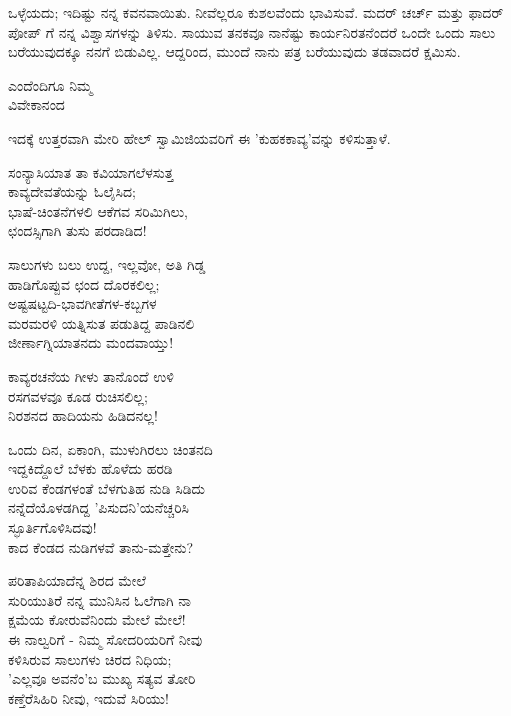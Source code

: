 ಒಳ್ಳೆಯದು; ಇದಿಷ್ಟು ನನ್ನ ಕವನವಾಯಿತು. ನೀವೆಲ್ಲರೂ ಕುಶಲವೆಂದು ಭಾವಿಸುವೆ. ಮದರ್ ಚರ್ಚ್ ಮತ್ತು ಫಾದರ್ ಪೋಪ್ ಗೆ ನನ್ನ ವಿಶ್ವಾಸಗಳನ್ನು ತಿಳಿಸು. ಸಾಯುವ ತನಕವೂ ನಾನೆಷ್ಟು ಕಾರ್ಯನಿರತನೆಂದರೆ ಒಂದೇ ಒಂದು ಸಾಲು ಬರೆಯುವುದಕ್ಕೂ ನನಗೆ ಬಿಡುವಿಲ್ಲ. ಆದ್ದರಿಂದ, ಮುಂದೆ ನಾನು ಪತ್ರ ಬರೆಯುವುದು ತಡವಾದರೆ ಕ್ಷಮಿಸು.

\begin{flushright}
ಎಂದೆಂದಿಗೂ ನಿಮ್ಮ\\ವಿವೇಕಾನಂದ
\end{flushright}

ಇದಕ್ಕೆ ಉತ್ತರವಾಗಿ ಮೇರಿ ಹೇಲ್ ಸ್ವಾಮಿಜಿಯವರಿಗೆ ಈ 'ಕುಹಕಕಾವ್ಯ'ವನ್ನು ಕಳಿಸುತ್ತಾಳೆ.

\begin{myquote}
ಸಂನ್ಯಾಸಿಯಾತ ತಾ ಕವಿಯಾಗಲೆಳಸುತ್ತ\\ಕಾವ್ಯದೇವತೆಯನ್ನು ಓಲೈಸಿದ;\\ಭಾಷೆ-ಚಿಂತನೆಗಳಲಿ ಆಕೆಗವ ಸರಿಮಿಗಿಲು,\\ಛಂದಸ್ಸಿಗಾಗಿ ತುಸು ಪರದಾಡಿದ!
\end{myquote}

\begin{myquote}
ಸಾಲುಗಳು ಬಲು ಉದ್ದ, ಇಲ್ಲವೋ, ಅತಿ ಗಿಡ್ಡ\\ಹಾಡಿಗೊಪ್ಪುವ ಛಂದ ದೊರಕಲಿಲ್ಲ;\\ಅಷ್ಟಷಟ್ಟದಿ-ಭಾವಗೀತೆಗಳ-ಕಬ್ಬಗಳ\\ಮರಮರಳಿ ಯತ್ನಿಸುತ ಪಡುತಿದ್ದ ಪಾಡಿನಲಿ\\ಜೀರ್ಣಾಗ್ನಿಯಾತನದು ಮಂದವಾಯ್ತು!
\end{myquote}

\begin{myquote}
ಕಾವ್ಯರಚನೆಯ ಗೀಳು ತಾನೊಂದೆ ಉಳಿ\\ರಸಗವಳವೂ ಕೂಡ ರುಚಿಸಲಿಲ್ಲ;\\ನಿರಶನದ ಹಾದಿಯನು ಹಿಡಿದನಲ್ಲ!
\end{myquote}

\begin{myquote}
ಒಂದು ದಿನ, ಏಕಾಂಗಿ, ಮುಳುಗಿರಲು ಚಿಂತನದಿ\\ಇದ್ದಕಿದ್ದೊಲೆ ಬೆಳಕು ಹೊಳೆದು ಹರಡಿ\\ಉರಿವ ಕೆಂಡಗಳಂತೆ ಬೆಳಗುತಿಹ ನುಡಿ ಸಿಡಿದು\\ನನ್ನೆದೆಯೊಳಡಗಿದ್ದ 'ಪಿಸುದನಿ'ಯನೆಚ್ಚರಿಸಿ\\ಸ್ಫೂರ್ತಿಗೊಳಿಸಿದವು!\\ಕಾದ ಕೆಂಡದ ನುಡಿಗಳವೆ ತಾನು-ಮತ್ತೇನು?
\end{myquote}

\begin{myquote}
ಪರಿತಾಪಿಯಾದೆನ್ನ ಶಿರದ ಮೇಲೆ\\ಸುರಿಯುತಿರೆ ನನ್ನ ಮುನಿಸಿನ ಓಲೆಗಾಗಿ ನಾ\\ಕ್ಷಮೆಯ ಕೋರುವೆನಿಂದು ಮೇಲೆ ಮೇಲೆ!\\ಈ ನಾಲ್ವರಿಗೆ - ನಿಮ್ಮ ಸೋದರಿಯರಿಗೆ ನೀವು\\ಕಳಿಸಿರುವ ಸಾಲುಗಳು ಚಿರದ ನಿಧಿಯ;\\'ಎಲ್ಲವೂ ಅವನೆಂ'ಬ ಮುಖ್ಯ ಸತ್ಯವ ತೋರಿ\\ಕಣ್ತೆರೆಸಿಹಿರಿ ನೀವು, ಇದುವೆ ಸಿರಿಯು!
\end{myquote}

